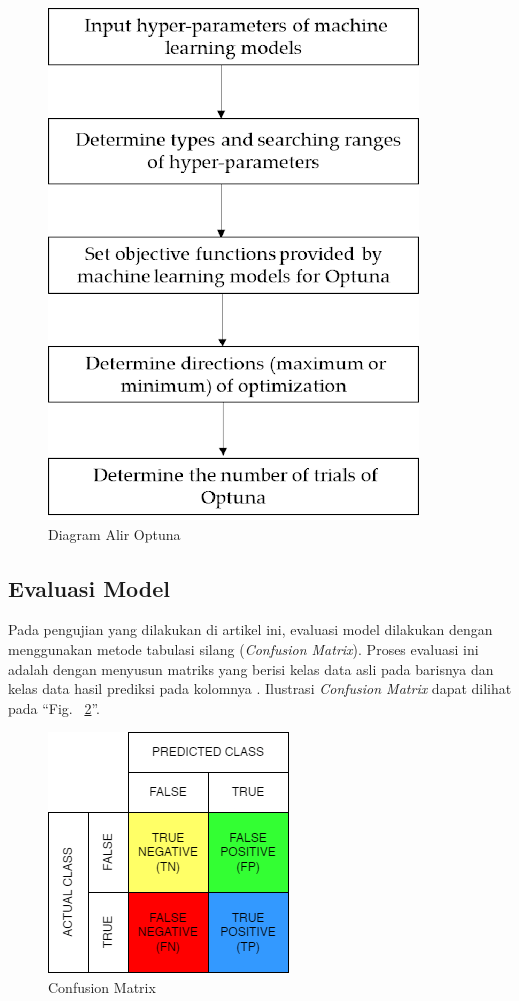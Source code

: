 \documentclass[conference]{IEEEtran}
\begin{document}
\begin{figure}[htbp]
    \centerline{\includegraphics[scale=0.5]{optuna.png}}
    \caption{Diagram Alir Optuna}
    \label{optuna_flow}
\end{figure}

\subsection{Evaluasi Model}

Pada pengujian yang dilakukan di artikel ini, evaluasi model dilakukan dengan menggunakan metode tabulasi silang (\textit{Confusion Matrix}). 
Proses evaluasi ini adalah dengan menyusun matriks yang berisi kelas data asli pada barisnya dan kelas data hasil prediksi pada kolomnya \cite{b46}. 
Ilustrasi \textit{Confusion Matrix} dapat dilihat pada ``Fig. ~\ref{confusionmatrix}''.

\begin{figure}[htbp]
    \centerline{\includegraphics[scale=0.5]{confusionmatrix.png}}
    \caption{Confusion Matrix}
    \label{confusionmatrix}
\end{figure}
\end{document}
